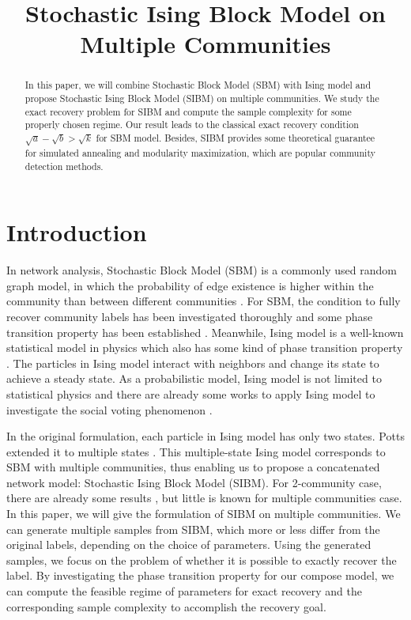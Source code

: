 \label{key}\documentclass[conference]{IEEEtran}
\title{Stochastic Ising Block Model on Multiple Communities}
\author{%
	\IEEEauthorblockN{Feng Zhao}
	\IEEEauthorblockA{Department of Electronic Engineering\\
	Tsinghua University\\ 
	Beijing, China 100084\\
	Email: zhaof17@mails.tsinghua.edu.cn}
	\and
	\IEEEauthorblockN{Shao-Lun Huang}
	\IEEEauthorblockA{DSIT Research Center\\
	Tsinghua-Berkeley Shenzhen Institute\\
	Shenzhen, China 518055\\
	Email: shaolun.huang@sz.tsinghua.edu.cn}
}
\begin{document}
\maketitle
\begin{abstract}
 In this paper, we will combine Stochastic Block Model (SBM) with Ising model and propose Stochastic Ising Block Model (SIBM) on multiple communities.
 We study the exact recovery problem for SIBM and compute the sample complexity for some properly chosen regime.
 Our result leads to the classical exact recovery condition $\sqrt{a} - \sqrt{b} > \sqrt{k}$ for SBM model.
 Besides, SIBM provides some theoretical guarantee for simulated annealing and modularity maximization, which are popular community detection methods.
\end{abstract}
\section{Introduction}
In network analysis, Stochastic Block Model (SBM) is a commonly used random graph model, in which the probability of edge existence is higher within the community than between different communities \cite{holland1983stochastic}. For SBM, the condition to fully recover community labels has been investigated thoroughly and some phase transition property has been established \cite{Abbe17}. Meanwhile, Ising model is a well-known statistical model in physics which also has some kind of phase transition property \cite{ising1925beitrag}. The particles in Ising model interact with neighbors and change its state to achieve a steady state.
As a probabilistic model, Ising model is not limited to statistical physics and there are already some works to apply Ising model to investigate the social voting phenomenon \cite{sznajd2000opinion}.

In the original formulation, each particle in Ising model has only two states. Potts extended it to multiple states \cite{potts1952some}. This multiple-state Ising model
corresponds to SBM with multiple communities, thus enabling us to propose a concatenated network model: Stochastic Ising Block Model (SIBM). For 2-community case, there are already some results \cite{ye2020exact}, but little is known for multiple communities case. In this paper, we will give the formulation of SIBM on multiple
communities. We can generate multiple samples from SIBM, which more or less differ from the original labels, depending on the choice of parameters. Using the generated samples, we focus on the problem of whether it is possible to exactly recover the label. By investigating the phase transition property for our compose model,
we can compute the feasible regime of parameters for exact recovery and the corresponding sample complexity to accomplish the recovery goal.
\end{document}

